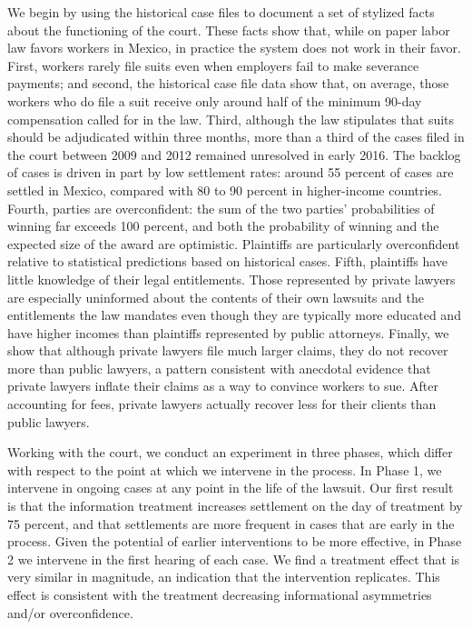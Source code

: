 \documentclass[11pt, a4paper]{article}
\begin{document}
We begin by using the historical case files to document a set of stylized facts about the functioning of the court. These facts show that, while on paper labor law favors workers in Mexico, in practice the system does not work in their favor. First, workers rarely file suits even when employers fail to make severance payments; and second, the historical case file data show that, on average, those workers who do file a suit receive only around half of the minimum 90-day compensation called for in the law. Third, although the law stipulates that suits should be adjudicated within three months, more than a third of the cases filed in the court between 2009 and 2012 remained unresolved in early 2016. The backlog of cases is driven in part by low settlement rates: around 55 percent of cases are settled in Mexico, compared with 80 to 90 percent in higher-income countries. Fourth, parties are overconfident: the sum of the two parties' probabilities of winning far exceeds 100 percent, and both the probability of winning and the expected size of the award are optimistic. Plaintiffs are particularly overconfident relative to statistical predictions based on historical cases. Fifth, plaintiffs have little knowledge of their legal entitlements. Those represented by private lawyers are especially uninformed about the contents of their own lawsuits and the entitlements the law mandates even though they are typically more educated and have higher incomes than plaintiffs represented by public attorneys. Finally, we show that although private lawyers file much larger claims, they do not recover more than public lawyers, a pattern consistent with anecdotal evidence that private lawyers inflate their claims as a way to convince workers to sue. After accounting for fees, private lawyers actually recover less for their clients than public lawyers.

Working with the court, we conduct an experiment in three phases, which differ with respect to the point at which we intervene in the process. In Phase 1, we intervene in ongoing cases at any point in the life of the lawsuit. Our first result is that  the information treatment increases settlement on the day of treatment by 75 percent, and that settlements are more frequent in cases that are early in the process. Given the potential of earlier interventions to be more effective, in Phase 2 we intervene in the first hearing of each case. We find a treatment effect that is very similar in magnitude, an indication that the intervention replicates. This effect is consistent with the treatment decreasing informational asymmetries and/or overconfidence. 
\end{document}
